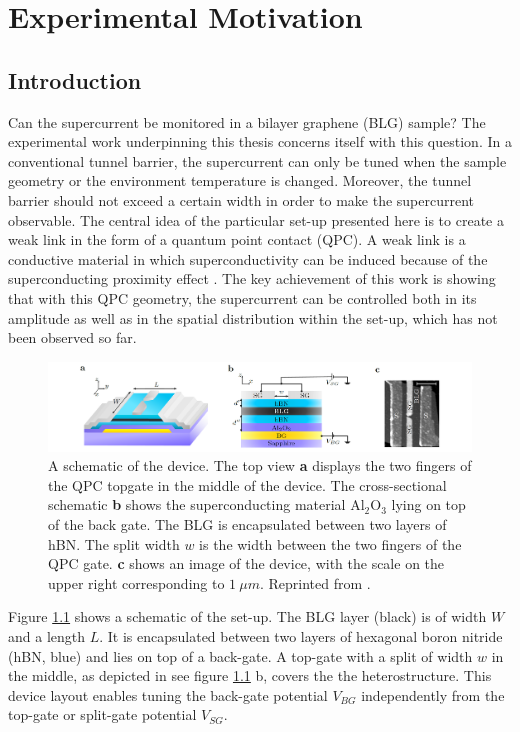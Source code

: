 \chapter{Experimental Motivation}
\label{ch:experiment}

\section{Introduction}
Can the supercurrent be monitored in a bilayer graphene (BLG) sample? The experimental work underpinning this thesis concerns itself with this question. In a conventional tunnel barrier, the supercurrent can only be tuned when the sample geometry or the environment temperature is changed. Moreover, the tunnel barrier should not exceed a certain width in order to make the supercurrent observable. The central idea of the particular set-up presented here is to create a weak link in the form of a quantum point contact (QPC). A weak link is a conductive material in which superconductivity can be induced because of the superconducting proximity effect \cite{Likharev1979}. The key achievement of this work is showing that with this QPC geometry, the supercurrent can be controlled both in its amplitude as well as in the spatial distribution within the set-up, which has not been observed so far.
\begin{figure}[h]
\centering
\includegraphics[width=\textwidth]{figure/experiment/setup}
\caption{A schematic of the device. The top view \textbf{a} displays the two fingers of the QPC topgate in the middle of the device. The cross-sectional schematic \textbf{b} shows the superconducting material $\text{Al}_2\text{O}_3$ lying on top of the back gate. The BLG is encapsulated between two layers of hBN. The split width $w$ is the width between the two fingers of the QPC gate. \textbf{c} shows an image of the device, with the scale on the upper right corresponding to $1\ \mu m$. Reprinted from \cite{Kraft2017}.}\label{fig:setup}
\end{figure}
Figure \ref{fig:setup} shows a schematic of the set-up. The BLG layer (black) is of width $W$ and a length $L$. It is encapsulated between two layers of hexagonal boron nitride (hBN, blue) and lies on top of a back-gate. A top-gate with a split of width $w$ in the middle, as depicted in see figure \ref{fig:setup} b, covers the the heterostructure. This device layout enables tuning the back-gate potential $V_{BG}$ independently from the top-gate or split-gate potential $V_{SG}$.


